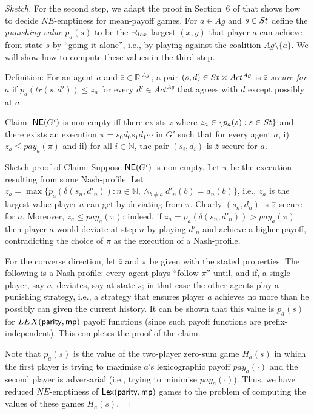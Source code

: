 \begin{proof}[Sketch]
For the second step, we adapt the proof in Section~6 of \cite{DBLP:conf/concur/UmmelsW11} that shows how to decide $NE$-emptiness for mean-payoff games. For $a \in Ag$ and $s \in St$ define the \emph{punishing value} $p_a(s)$ to be the $\prec_{lex}$-largest $(x,y)$ that player $a$ can achieve from state $s$ by ``going it alone'', i.e., by playing against the coalition $Ag \setminus \{a\}$.  We will show how to compute these values in the third step. 

Definition: For an agent $a$ and $\bar{z} \in \mathbb{R}^{|Ag|}$, a pair $(s,d) \in St \times Act^{Ag}$ is \emph{$\bar{z}$-secure for $a$} if $p_a(tr(s,d')) \leq z_a$ for every $d' \in Act^{Ag}$ that agrees with $d$ except possibly at $a$. 

Claim: ${\sf NE}(G')$ is non-empty iff there exists $\bar{z}$ where $z_a \in \{p_a(s) : s \in St\}$ and there exists an execution $\pi = s_0 d_0 s_1 d_1 \cdots$ in $G'$ such that for every agent $a$,  i) $z_a \leq pay_a(\pi)$ and ii) for all $i \in \mathbb{N}$, the pair $(s_i,d_i)$ is $\bar{z}$-secure for $a$. 


Sketch proof of Claim: Suppose ${\sf NE}(G')$ is non-empty. Let $\pi$ be the execution resulting from some Nash-profile. 
Let $z_a = \max\{p_a(\delta(s_n,d'_n)) : n \in \mathbb{N}, \wedge_{b \neq a} d'_n(b) = d_n(b)\}$, i.e., $z_a$ is the largest value player $a$ can get by deviating from $\pi$. Clearly $(s_n,d_n)$ is $\overline{z}$-secure for $a$. Moreover, $z_a \leq pay_a(\pi)$: indeed, if $z_a = p_a(\delta(s_n,d'_n)) > pay_a(\pi)$ then player $a$ would deviate at step $n$ by playing $d'_n$ and achieve a higher payoff, contradicting the choice of $\pi$ as the execution of a Nash-profile.

For the converse direction, let $\bar{z}$ and $\pi$ be given with the stated properties. The following is a Nash-profile: every agent plays ``follow $\pi$'' until, and if, a single player, say $a$, deviates, say at state $s$; in that case the other agents play a punishing strategy, i.e., a strategy that ensures player $a$ achieves no more than he possibly can given the current history. It can be shown that this value is $p_a(s)$ for $LEX({\sf parity},{\sf mp})$ payoff functions (since such payoff functions are prefix-independent). This completes the proof of the claim.





Note that $p_a(s)$ is the value of the two-player zero-sum game $H_a(s)$ in which the first player is trying to maximise $a$'s lexicographic payoff $pay_a(\cdot)$ and the second player is adversarial (i.e., trying to minimise $pay_a(\cdot)$). 
Thus, we have 
reduced $NE$-emptiness of ${\sf Lex}({\sf parity},{\sf mp})$ games to the problem of computing the values of these games $H_a(s)$. 


\end{proof}
